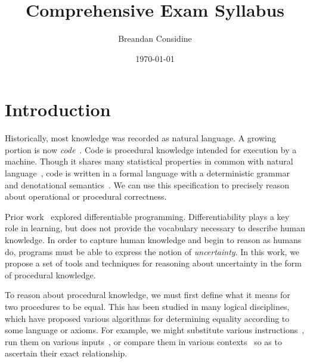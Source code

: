 \documentclass[11pt]{article}
\title{Comprehensive Exam Syllabus}
\author{Breandan Considine}
\date{\today}
\begin{document}
    \maketitle

    \tableofcontents
    \pagebreak

%

    \section{Introduction}

    Historically, most knowledge was recorded as natural language. A growing portion is now \textit{code}~\citep{allamanis2018survey}. Code is procedural knowledge intended for execution by a machine. Though it shares many statistical properties in common with natural language~\citep{hindle2012naturalness}, code is written in a formal language with a deterministic grammar and denotational semantics~\citep{pierce2010software}. We can use this specification to precisely reason about operational or procedural correctness.

    Prior work~\citep{considine2019kotlingrad,considine2019programming} explored differentiable programming. Differentiability plays a key role in learning, but does not provide the vocabulary necessary to describe human knowledge. In order to capture human knowledge and begin to reason as humans do, programs must be able to express the notion of \textit{uncertainty}. In this work, we propose a set of tools and techniques for reasoning about uncertainty in the form of procedural knowledge.

    To reason about procedural knowledge, we must first define what it means for two procedures to be equal. This has been studied in many logical disciplines, which have proposed various algorithms for determining equality according to some language or axioms. For example, we might substitute various instructions~\citep{baader1999term}, run them on various inputs~\citep{chen2020metamorphic}, or compare them in various contexts~\citep{felleisen1990expressive} so as to ascertain their exact relationship.
\end{document}
